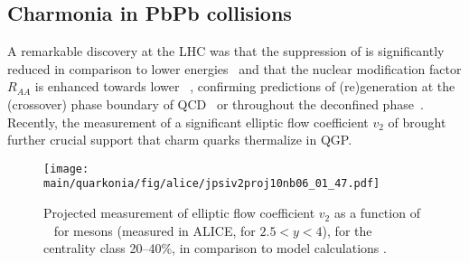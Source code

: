 \documentclass[../report.tex]{subfiles}
\providecommand{\main}{..}
\begin{document}


\subsection{Charmonia in PbPb collisions} %

A remarkable discovery at the LHC was that the suppression of \PJgy is significantly reduced in comparison to lower energies~\cite{Abelev:2012rv} and that the nuclear modification factor $R_{AA}$ is enhanced towards lower \pT~\cite{Abelev:2013ila,Adam:2016rdg}, confirming predictions of (re)generation at the (crossover) phase boundary of QCD~\cite{BraunMunzinger:2000px} or throughout the deconfined phase~\cite{Thews:2000rj,Zhao:2011cv}.
Recently, the measurement of a significant elliptic flow coefficient $v_2$ of \PJgy \cite{Acharya:2017tgv} brought further crucial support that charm quarks thermalize in QGP.



  
\begin{figure}[h]
\begin{center}
 \texttt{[image: \\main/quarkonia/fig/alice/jpsiv2proj10nb06\_01\_47.pdf]}
\end{center}
 \caption{Projected measurement of elliptic flow coefficient $v_2$ as a function of \pT~ for \PJgy mesons (measured in ALICE, for $2.5<y<4$), for the centrality class 20--40\%, in comparison to model calculations \cite{Du:2015wha}.}
\label{FigQ:v2pTPbPb}
\end{figure}
\end{document}
